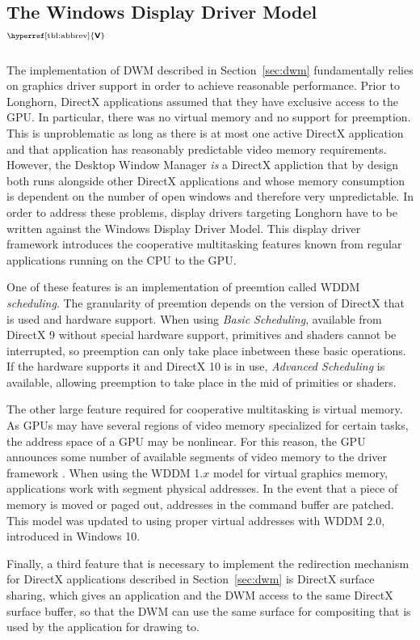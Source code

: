 \documentclass[10pt,twocolumn,a4paper,os=win]{article}
\newcommand{\bs}[1]{\textbf{\sffamily #1}}
\newcommand{\winver}[1]{$^{\text{\hyperref[tbl:abbrev]{\bs{#1}}}}$}
\newcommand{\winsubsection}[2]{\subsection[#1]{#1\winver{#2}}}
\begin{document}
		\winsubsection{The Windows Display Driver Mo\-del}{V}\label{sec:wddm}
			The implementation of DWM described in Section~\ref{sec:dwm}
			fundamentally relies on graphics driver support in order to achieve
			reasonable performance.  Prior to Longhorn, DirectX applications
			assumed that they have exclusive access to the GPU. In particular,
			there was no virtual memory and no support for preemption. This is
			unproblematic as long as there is at most one active DirectX application
			and that application has reasonably predictable video memory requirements.
			However, the Desktop Window Manager \emph{is} a DirectX appliction that
			by design both runs alongside other DirectX applications and whose
			memory consumption is dependent on the number of open windows and therefore
			very unpredictable.
			In order to address these problems, display drivers targeting Longhorn
			have to be written against the Windows Display Driver Model. This
			display driver framework introduces the cooperative multitasking
			features known from regular applications running on the CPU to the
			GPU. \cite{dwmwddm}

			One of these features is an implementation of preemtion called
			WDDM \emph{scheduling}. The granularity of preemtion depends on
			the version of DirectX that is used and hardware support. When
			using \emph{Basic Scheduling}, available from DirectX 9 without
			special hardware support, primitives and shaders cannot be interrupted,
			so preemption can only take place inbetween these basic operations.
			If the hardware supports it and DirectX 10 is in use, \emph{Advanced
			Scheduling} is available, allowing preemption to take place in the mid
			of primities or shaders. \cite{dwmwddm}

			The other large feature required for cooperative multitasking is
			virtual memory. As GPUs may have several regions of video memory
			specialized for certain tasks, the address space of a GPU may
			be nonlinear. For this reason, the GPU announces some number of
			available segments of video memory to the driver framework \cite{gpuseg}.
			When using the WDDM 1.$x$ model for virtual graphics
			memory, applications work with segment physical addresses. In the event
			that a piece of memory is moved or paged out, addresses in the command
			buffer are patched. This model was updated to using proper virtual
			addresses with WDDM 2.0, introduced in Windows 10. \cite{wddm2}

			Finally, a third feature that is necessary to implement the redirection
			mechanism for DirectX applications described in Section~\ref{sec:dwm}
			is DirectX surface sharing, which gives an application and the DWM
			access to the same DirectX surface buffer, so that the DWM can use the
			same surface for compositing that is used by the application for
			drawing to. \cite{dwmredirect}
\end{document}
